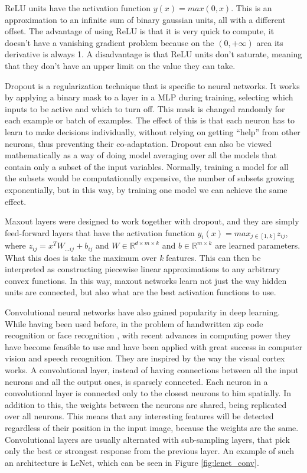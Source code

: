 ReLU units have the activation function $ y(x) = max(0,x) $. This is an approximation to an infinite sum of binary gaussian units, all with a different offset. The advantage of using ReLU is that it is very quick to compute, it doesn't have a vanishing gradient problem because on the $ (0, +\infty) $ area its derivative is always 1. A disadvantage is that ReLU units don't saturate, meaning that they don't have an upper limit on the value they can take. 

Dropout is a regularization technique that is specific to neural networks. It works by applying a binary mask to a layer in a MLP during training, selecting which inputs to be active and which to turn off. This mask is changed randomly for each example or batch of examples. The effect of this is that each neuron has to learn to make decisions individually, without relying on getting ``help'' from other neurons, thus preventing their co-adaptation. Dropout can also be viewed mathematically as a way of doing model averaging over all the models that contain only a subset of the input variables. Normally, training a model for all the subsets would be computationally expensive, the number of subsets growing exponentially, but in this way, by training one model we can achieve the same effect. 

Maxout layers were designed to work together with dropout, and they are simply feed-forward layers that have the activation function $ y_i(x) = max_{j\in[1,k]} z_{ij} $, where $ z_{ij} = x^T W_{...ij} +b_{ij} $ and $ W \in \mathbb{R}^{d \times m \times k } $ and $ b \in \mathbb{R} ^{ m \times k } $ are learned parameters. What this does is take the maximum over \textit{k} features. This can then be interpreted as constructing piecewise linear approximations to any arbitrary convex functions. In this way, maxout networks learn not just the way hidden units are connected, but also what are the best activation functions to use. 

Convolutional neural networks have also gained popularity in deep learning. While having been used before, in the problem of handwritten zip code recognition  \cite{lecun1989backpropagation} or face recognition \cite{lawrence1997face}, with recent advances in computing power they have become feasible to use and have been applied with great success in computer vision and speech recognition. They are inspired by the way the visual cortex works. A convolutional layer, instead of having connections between all the input neurons and all the output ones, is sparsely connected. Each neuron in a convolutional layer is connected only to the closest neurons to him spatially. In addition to this, the weights between the neurons are shared, being replicated over all neurons. This means that any interesting features will be detected regardless of their position in the input image, because the weights are the same. Convolutional layers are usually alternated with sub-sampling layers, that pick only the best or strongest response from the previous layer. An example of such an architecture is LeNet, which can be seen in Figure \ref{fig:lenet_conv}. 


